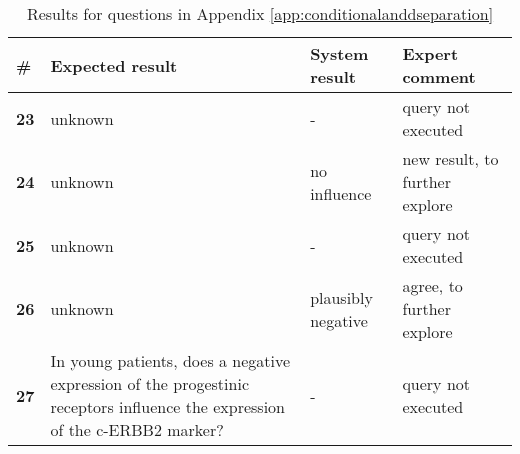\begin{table}[h]
	\centering
	\caption{Results for questions in Appendix \ref{app:conditionalanddseparation}}
	\begin{tabularx}{\textwidth}{lXXX}
		\toprule
		\textbf{\#} & Expected result & System result & Expert comment  \\
		\midrule	
		\textbf{23} & unknown &    -   & query not executed \\
		\addlinespace
		\textbf{24} & unknown & no influence & new result, to further explore \\
		\addlinespace
		\textbf{25} & unknown &   -    & query not executed \\
		\addlinespace
		\textbf{26} & unknown & plausibly negative & agree, to further explore \\
		\addlinespace[2ex]
		\textbf{27} & In young patients, does a negative expression of the progestinic receptors influence the expression of the c-ERBB2 marker? &    -   & query not executed \\
		\bottomrule
		\end{tabularx}
	\label{tab:resultscondsepquestions}
\end{table}

